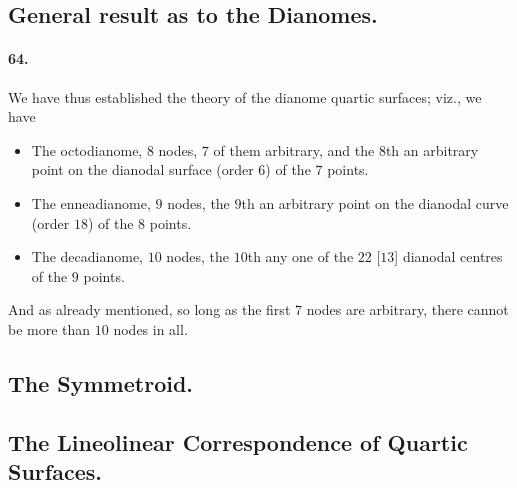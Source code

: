 \documentclass[11pt,a4paper]{article}
\begin{document}
\bigskip

\subsection*{General result as to the Dianomes.}

\paragraph{64.}
We have thus established the theory of the dianome quartic surfaces; viz., we have
\begin{itemize}\setlength{\itemsep}{2pt}
  \item The octodianome, $8$ nodes, $7$ of them arbitrary, and the $8$th an arbitrary
        point on the dianodal surface (order $6$) of the $7$ points.
  \item The enneadianome, $9$ nodes, the $9$th an arbitrary point on the dianodal
        curve (order $18$) of the $8$ points.
  \item The decadianome, $10$ nodes, the $10$th any one of the $22$ [$13$] dianodal
        centres of the $9$ points.
\end{itemize}
And as already mentioned, so long as the first $7$ nodes are arbitrary, there cannot
be more than $10$ nodes in all.

\bigskip

\subsection*{The Symmetroid.}
\subsection*{The Lineolinear Correspondence of Quartic Surfaces.}
\end{document}
